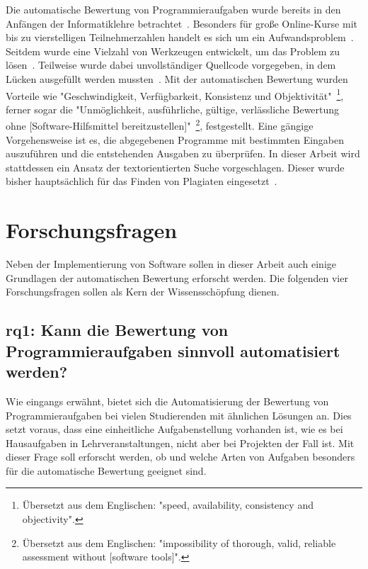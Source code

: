 Die automatische Bewertung von Programmieraufgaben wurde bereits in den Anfängen der Informatiklehre betrachtet~\cite{hollingsworth-1960}.
Besonders für große Online-Kurse mit bis zu vierstelligen Teilnehmerzahlen handelt es sich um ein Aufwandsproblem~\cite{pieterse-2013}.
Seitdem wurde eine Vielzahl von Werkzeugen entwickelt, um das Problem zu lösen~\cite{jackson-1997-assyst,edwards-2008-web-cat,enstroem-et-al-2011,vander-zanden-2012}.
Teilweise wurde dabei unvollständiger Quellcode vorgegeben, in dem Lücken ausgefüllt werden mussten~\cite{vander-zanden-2012}.
Mit der automatischen Bewertung wurden Vorteile wie "Geschwindigkeit, Verfügbarkeit, Konsistenz und Objektivität"~\cite{ala-mutka-2005}\footnote{
    Übersetzt aus dem Englischen: "speed, availability, consistency and objectivity".
}, ferner sogar die "Unmöglichkeit, ausführliche, gültige, verlässliche Bewertung ohne [Software-Hilfsmittel bereitzustellen]"~\cite{kay-1994}\footnote{
    Übersetzt aus dem Englischen: "impossibility of thorough, valid, reliable assessment without [software tools]".
}, festgestellt.
Eine gängige Vorgehensweise ist es, die abgegebenen Programme mit bestimmten Eingaben auszuführen und die entstehenden Ausgaben zu überprüfen.
In dieser Arbeit wird stattdessen ein Ansatz der textorientierten Suche vorgeschlagen.
Dieser wurde bisher hauptsächlich für das Finden von Plagiaten eingesetzt~\cite{aiken-2002,prechelt-2003}.

\section{Forschungsfragen}\label{sec:research-questions}

Neben der Implementierung von Software sollen in dieser Arbeit auch einige Grundlagen der automatischen Bewertung erforscht werden.
Die folgenden vier Forschungsfragen sollen als Kern der Wissensschöpfung dienen.

\subsection[\acs{rq}1]{\ac{rq}1: Kann die Bewertung von Programmieraufgaben sinnvoll automatisiert werden?}\label{subsec:rq1-useful-automation}

Wie eingangs erwähnt, bietet sich die Automatisierung der Bewertung von Programmieraufgaben bei vielen Studierenden mit ähnlichen Lösungen an.
Dies setzt voraus, dass eine einheitliche Aufgabenstellung vorhanden ist, wie es bei Hausaufgaben in Lehrveranstaltungen, nicht aber bei Projekten der Fall ist.
Mit dieser Frage soll erforscht werden, ob und welche Arten von Aufgaben besonders für die automatische Bewertung geeignet sind.

